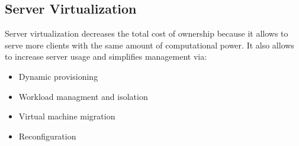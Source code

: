 \subsection{Server Virtualization}
Server virtualization decreases the total cost of ownership because it allows to serve more clients with the same amount of computational power. It also allows to increase server usage and simplifies management via:
\begin{itemize}
    \item Dynamic provisioning
    \item Workload managment and isolation
    \item Virtual machine migration
    \item Reconfiguration
\end{itemize}